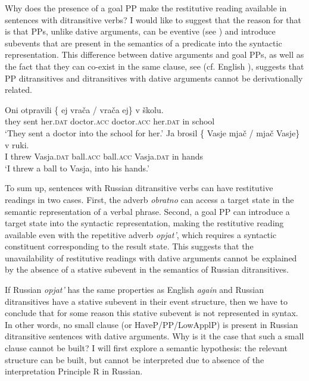 \documentclass[output=paper]{langscibook}
\begin{document}
Why does the presence of a goal PP make the restitutive reading available in sentences with ditransitive verbs? I would like to suggest that the reason for that is that PPs, unlike dative arguments, can be eventive (see \citealt{McIntyre2006}) and introduce subevents that are present in the semantics of a predicate into the syntactic representation. This difference between dative arguments and goal PPs, as well as the fact that they can co-exist in the same clause, see  (cf. English ), suggests that PP ditransitives and ditransitives with dative arguments cannot be derivationally related.


 \ea\label{ex:bondarenko:25x}\ea\label{ex:bondarenko:25}
\gll Oni otpravili \{\hspace{-2pt} ej vrača / vrača ej\} v školu.\\
     they sent {} her.\textsc{dat} doctor.\textsc{acc} {} doctor.\textsc{acc} her.\textsc{dat} in school\\
\glt `They sent a doctor into the school for her.'
 \ex\label{ex:bondarenko:26}
\gll Ja brosil \{\hspace{-2pt} Vasje mjač / mjač Vasje\} v ruki.\\
     I threw {} Vasja.\textsc{dat} ball.\textsc{acc} {} ball.\textsc{acc} Vasja.\textsc{dat} in hands\\
\glt `I threw a ball to Vasja, into his hands.'
\z\z

 \ea\label{ex:bondarenko:27x}\label{ex:bondarenko:27}
\z\z


\noindent To sum up, sentences with Russian ditransitive verbs can have restitutive readings in two cases. First, the adverb \textit{obratno} can access a target state in the semantic representation of a verbal phrase. Second, a goal PP can introduce a target state into the syntactic representation, making the restitutive reading available even with the repetitive adverb \textit{opjat’}, which requires a syntactic constituent corresponding to the result state. This suggests that the unavailability of restitutive readings with dative arguments cannot be explained by the absence of a stative subevent in the semantics of Russian ditransitives.



If Russian \textit{opjat’} has the same properties as English \textit{again} and Russian ditransitives have a stative subevent in their event structure, then we have to conclude that for some reason this stative subevent is not represented in syntax. In other words, no small clause (or HaveP\slash PP\slash LowApplP) is present in Russian ditransitive sentences with dative arguments. Why is it the case that such a small clause cannot be built? I will first explore a semantic hypothesis: the relevant structure can be built, but cannot be interpreted due to absence of the interpretation Principle R in Russian.
\end{document}
